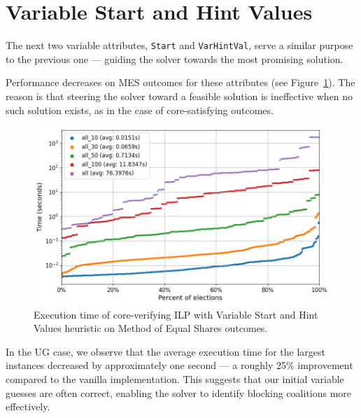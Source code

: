 \documentclass[magisterska,en]{pracamgr}
\newcommand\chartsize{0.94}
\begin{document}
\section{Variable Start and Hint Values}

The next two variable attributes, \texttt{Start} and \texttt{VarHintVal}, serve a similar purpose to the previous one --- guiding the solver towards the most promising solution.

Performance decreases on MES outcomes for these attributes (see Figure~\ref{start-and-hint-mes}). The reason is that steering the solver toward a feasible solution is ineffective when no such solution exists, as in the case of core-satisfying outcomes.

\begin{figure}[h!]
    \centering
    \includegraphics[width=\chartsize\linewidth]{outputs/StartandVarHintVal/mes.png}
    \caption{Execution time of core-verifying ILP with Variable Start and Hint Values heuristic on Method of Equal Shares outcomes.}
    \label{start-and-hint-mes}
\end{figure}

In the UG case, we observe that the average execution time for the largest instances decreased by approximately one second --- a roughly 25\% improvement compared to the vanilla implementation. This suggests that our initial variable guesses are often correct, enabling the solver to identify blocking coalitions more effectively.
\end{document}
